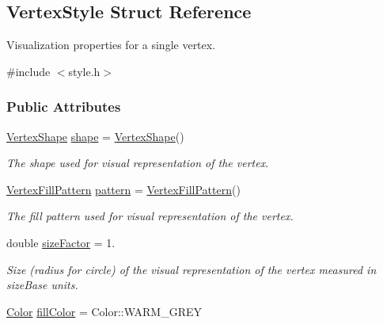 \hypertarget{structVertexStyle}{}\subsection{Vertex\+Style Struct Reference}
\label{structVertexStyle}


Visualization properties for a single vertex.  




{\ttfamily \#include $<$style.\+h$>$}

\subsubsection*{Public Attributes}
\begin{DoxyCompactItemize}
\item 
\hyperlink{style_8h_a30dad62fe4f72dc976c2cdf88d3d5f6a}{Vertex\+Shape} \hyperlink{structVertexStyle_aef086f102725a1f52d44699b25cda945}{shape} = \hyperlink{style_8h_a30dad62fe4f72dc976c2cdf88d3d5f6a}{Vertex\+Shape}()\hypertarget{structVertexStyle_aef086f102725a1f52d44699b25cda945}{}\label{structVertexStyle_aef086f102725a1f52d44699b25cda945}

\begin{DoxyCompactList}\small\item\em The shape used for visual representation of the vertex. \end{DoxyCompactList}\item 
\hyperlink{style_8h_a878b447bf90ef69a47207425eec2076e}{Vertex\+Fill\+Pattern} \hyperlink{structVertexStyle_a8a78c1f168be9b1da0f2ef2b127530e1}{pattern} = \hyperlink{style_8h_a878b447bf90ef69a47207425eec2076e}{Vertex\+Fill\+Pattern}()\hypertarget{structVertexStyle_a8a78c1f168be9b1da0f2ef2b127530e1}{}\label{structVertexStyle_a8a78c1f168be9b1da0f2ef2b127530e1}

\begin{DoxyCompactList}\small\item\em The fill pattern used for visual representation of the vertex. \end{DoxyCompactList}\item 
double \hyperlink{structVertexStyle_a3bc299c3309fc51eaad301314432482c}{size\+Factor} = 1.\hypertarget{structVertexStyle_a3bc299c3309fc51eaad301314432482c}{}\label{structVertexStyle_a3bc299c3309fc51eaad301314432482c}

\begin{DoxyCompactList}\small\item\em Size (radius for circle) of the visual representation of the vertex measured in size\+Base units. \end{DoxyCompactList}\item 
\hyperlink{colors_8h_ab87bacfdad76e61b9412d7124be44c1c}{Color} \hyperlink{structVertexStyle_a06b1dc5dcf2ea4be491e89d687556406}{fill\+Color} = Color\+::\+W\+A\+R\+M\+\_\+\+G\+R\+EY\hypertarget{structVertexStyle_a06b1dc5dcf2ea4be491e89d687556406}{}\label{structVertexStyle_a06b1dc5dcf2ea4be491e89d687556406}


\end{DoxyCompactItemize}
